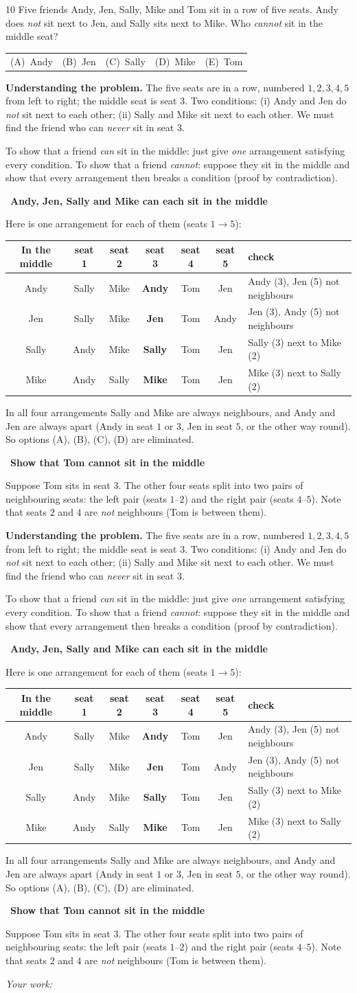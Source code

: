 \documentclass[11pt]{article}
\makeatletter
\newif\ifsol \soltrue
\newenvironment{probbox}[2]{\begin{probboxT}{#1}{#2}}{\end{probboxT}}
\newcommand{\StuProb}[2]{\begin{probboxS}{#1}{#2}\StuProbBody\end{probboxS}}
\newcommand{\probsol}[1]{%
  \begin{lrbox}{\solmeasure}\begin{minipage}{\dimexpr\linewidth-24pt\relax}#1\end{minipage}\end{lrbox}%
  \ifsol
    \begin{solbox}#1\end{solbox}%
  \else
    \setlength{\solht}{\dimexpr\ht\solmeasure+\dp\solmeasure+0.85cm\relax}%
    \ifdim\solht<1.35cm\setlength{\solht}{1.35cm}\fi
    \ifdim\solht>\StudentMaxWork\setlength{\solht}{\StudentMaxWork}\fi
    \par\noindent\begin{minipage}{\linewidth}%
    \expandafter\StuProb\StuProbArgs
    \begin{tcolorbox}[colback=white,colframe=Line,boxrule=0.8pt,arc=5pt,
      left=8pt,right=8pt,top=4pt,bottom=4pt,height=\solht]{\footnotesize\color{Slate}\itshape\WorkWord}\end{tcolorbox}%
    \end{minipage}\par\medskip
  \fi}
\newlength{\StudentMaxWork}\setlength{\StudentMaxWork}{4.5cm}
\newcommand{\step}[2]{\par\smallskip\noindent{\bfseries\color{tmBlue!85!black}\StepWord~#1.}\ {\bfseries #2}\par\nopagebreak}
\newcommand{\choices}[5]{\par\smallskip\noindent
  \begin{tabularx}{\linewidth}{@{}XXXXX@{}}(A)\ #1&(B)\ #2&(C)\ #3&(D)\ #4&(E)\ #5\end{tabularx}\par}
\def\WorkWord{Your work:}
\def\StepWord{Step}
\makeatother
\begin{document}
\begin{probbox}{10}{\relax}
Five friends Andy, Jen, Sally, Mike and Tom sit in a row of five seats. Andy does \emph{not} sit next to Jen, and Sally sits next to Mike. Who \emph{cannot} sit in the middle seat?
\choices{Andy}{Jen}{Sally}{Mike}{Tom}
\end{probbox}
\probsol{
\textbf{Understanding the problem.} The five seats are in a row, numbered $1,2,3,4,5$ from left to right; the middle seat is seat $3$. Two conditions: (i) Andy and Jen do \emph{not} sit next to each other; (ii) Sally and Mike sit next to each other. We must find the friend who can \emph{never} sit in seat $3$.
\begin{recallbox}To show that a friend \emph{can} sit in the middle: just give \emph{one} arrangement satisfying every condition. To show that a friend \emph{cannot}: suppose they sit in the middle and show that every arrangement then breaks a condition (proof by contradiction).\end{recallbox}
\step{1}{Andy, Jen, Sally and Mike can each sit in the middle}
Here is one arrangement for each of them (seats $1\to5$):
\begin{center}
\begin{tabular}{|c|c|c|c|c|c|l|}\hline
In the middle & seat 1 & seat 2 & \textbf{seat 3} & seat 4 & seat 5 & check\\ \hline
Andy & Sally & Mike & \textbf{Andy} & Tom & Jen & Andy (3), Jen (5) not neighbours\\ \hline
Jen & Sally & Mike & \textbf{Jen} & Tom & Andy & Jen (3), Andy (5) not neighbours\\ \hline
Sally & Andy & Mike & \textbf{Sally} & Tom & Jen & Sally (3) next to Mike (2)\\ \hline
Mike & Andy & Sally & \textbf{Mike} & Tom & Jen & Mike (3) next to Sally (2)\\ \hline
\end{tabular}
\end{center}
In all four arrangements Sally and Mike are always neighbours, and Andy and Jen are always apart (Andy in seat $1$ or $3$, Jen in seat $5$, or the other way round). So options (A), (B), (C), (D) are eliminated.
\step{2}{Show that Tom cannot sit in the middle}
Suppose Tom sits in seat $3$. The other four seats split into two pairs of neighbouring seats: the left pair (seats $1$--$2$) and the right pair (seats $4$--$5$). Note that seats $2$ and $4$ are \emph{not} neighbours (Tom is between them).
}
\end{document}
